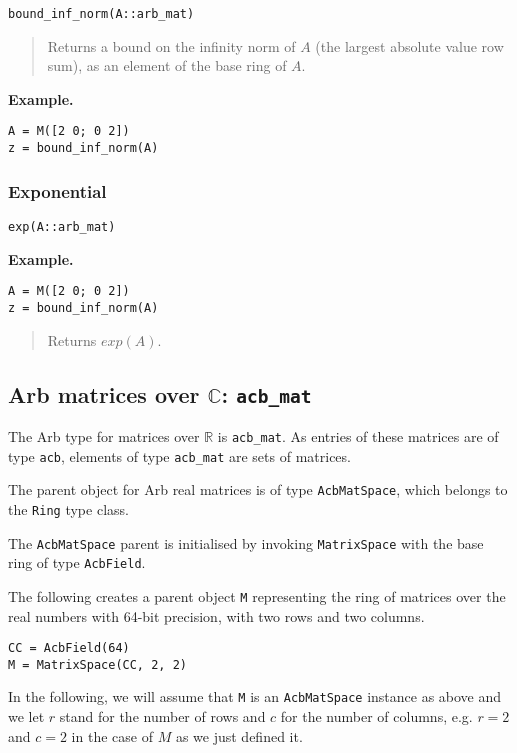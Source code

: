 \documentclass[a4paper,10pt]{article}
\newcommand{\C}{\mathbb{C}}
\newcommand{\R}{\mathbb{R}}
\newcommand{\code}{\lstinline}
\newcommand{\desc}[1]{\vspace{-3mm}\begin{quote}#1\end{quote}}
\begin{document}
{{\begin{lstlisting}
bound_inf_norm(A::arb_mat)
\end{lstlisting}

\desc{Returns a bound on the infinity norm of $A$
(the largest absolute value row sum), as
an element of the base ring of $A$.}

\textbf{Example.}

\begin{lstlisting}
A = M([2 0; 0 2])
z = bound_inf_norm(A)
\end{lstlisting}

\subsubsection{Exponential}

\begin{lstlisting}
exp(A::arb_mat)
\end{lstlisting}

\textbf{Example.}

\begin{lstlisting}
A = M([2 0; 0 2])
z = bound_inf_norm(A)
\end{lstlisting}

\desc{Returns $exp(A)$.}

\subsection{Arb matrices over $\C$: \code|acb_mat|}

The Arb type for matrices over $\R$ is \code{acb_mat}.
As entries of these matrices are of type \code{acb}, elements of type \code{acb_mat}
are sets of matrices.

The parent object for Arb real matrices is of type \code{AcbMatSpace}, which
belongs to the \code{Ring} type class.

The \code{AcbMatSpace} parent is initialised by invoking \code{MatrixSpace}
with the base ring of type \code{AcbField}.

The following creates a parent object \code{M} representing
the ring of matrices over the real numbers with 64-bit precision, with two rows
and two columns.

\begin{lstlisting}
CC = AcbField(64)
M = MatrixSpace(CC, 2, 2)
\end{lstlisting}

In the following, we will assume that \code{M} is an \code{AcbMatSpace}
instance as above and we let $r$ stand for the number of rows and $c$ for the
number of columns, e.g. $r = 2$ and $c = 2$ in the case of $M$ as we just defined it.

}}
\end{document}
